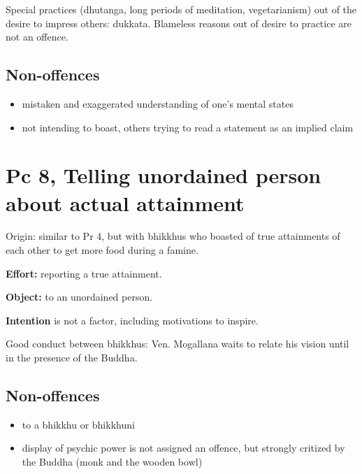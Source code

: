 Special practices (dhutanga, long periods of meditation, vegetarianism)
out of the desire to impress others: dukkata. Blameless reasons out of
desire to practice are not an offence.

\subsection{Non-offences}

\begin{itemize}
\tightlist
\item
  mistaken and exaggerated understanding of one's mental states
\item
  not intending to boast, others trying to read a statement as an
  implied claim
\end{itemize}

\section{Pc 8, Telling unordained person about actual attainment}

Origin: similar to Pr 4, but with bhikkhus who boasted of true
attainments of each other to get more food during a famine.

\textbf{Effort:} reporting a true attainment.

\textbf{Object:} to an unordained person.

\textbf{Intention} is not a factor, including motivations to inspire.

Good conduct between bhikkhus: Ven. Mogallana waits to relate his vision
until in the presence of the Buddha.

\subsection{Non-offences}

\begin{itemize}
\tightlist
\item
  to a bhikkhu or bhikkhuni
\item
  display of psychic power is not assigned an offence, but strongly
  critized by the Buddha (monk and the wooden bowl)
\end{itemize}

